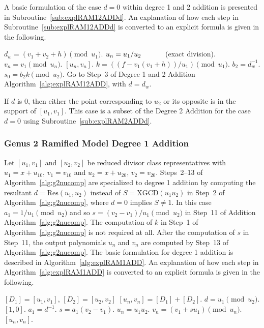 A basic formulation of the case $d = 0$ within degree 1 and 2 addition is presented in
Subroutine~\ref{sub:explRAM12ADDd}. An explanation of how each step in
Subroutine~\ref{sub:explRAM12ADDd} is converted to an explicit formula is given in
the following. 

\begin{subroutine}[htbp]
\caption{Genus 2 Ramified Model Degree 1 and 2 Addition ($d = 0$)\label{sub:explRAM12ADDd}}
\begin{algorithmic} [1]
\State $d_w = (v_1 + v_2 + h) \pmod{u_1}$.
    \State $u_n = u_1/u_2 \quad\quad\quad$ (exact division).
    \State $v_n = v_1 \pmod{u_n}.$
    \State \Return $[u_n,v_n]$.
\Else 
    \State $k = ((f - v_1(v_1 + h))/u_1) \pmod{u_1}$.
    \State $b_2 = d_w^{-1}$.
    \State $s_0 = b_2k \pmod{u_2}$.
    \State Go to Step~3 of Degree 1 and 2 Addition Algorithm~\ref{alg:explRAM12ADD}, with $d = d_w$.
\EndIf
\end{algorithmic}
\end{subroutine}

If $d$ is 0, then either the point corresponding to $u_2$ or its opposite is in
the support of $[u_1,v_1]$. This case is a subset of the Degree 2 Addition for
the case $d=0$ using Subroutine~\ref{sub:explRAM2ADDd}.


\subsubsection{Genus 2 Ramified Model Degree 1 Addition}
Let $[u_1,v_1]$ and $[u_2,v_2]$ be reduced divisor class representatives with
$u_1 = x + u_{10}$, $v_1 = v_{10}$ and $u_2 = x + u_{20}$, $v_2 = v_{20}$.
Steps~2--13 of Algorithm~\ref{alg:g2nucomp} are specialized to degree 1 addition by
computing the resultant $d = \mathrm{Res}(u_1,u_2)$ instead of $S =
\mathrm{XGCD}(u_1 u_2)$ in Step~2 of Algorithm~\ref{alg:g2nucomp}, where $d=0$
implies $S \neq 1$. In this case $a_1 = 1/u_1 \pmod{u_2}$ and so $s = (v_2 -
v_1)/u_1 \pmod{u_2}$ in Step~11 of Addition Algorithm~\ref{alg:g2nucomp}. The
computation of $k$ in Step~1 of Algorithm~\ref{alg:g2nucomp} is not required at
all. After the computation of $s$  in Step~11, the output polynomials $u_n$ and
$v_n$ are computed by Step~13 of Algorithm~\ref{alg:g2nucomp}. The basic
formulation for degree 1 addition is described in
Algorithm~\ref{alg:explRAM1ADD}. An explanation of how each step in
Algorithm~\ref{alg:explRAM1ADD} is converted to an explicit formula is given in
the following.

\begin{algorithm}[htbp]
\caption{Genus 2 Ramified Model Degree 1 Addition\label{alg:explRAM1ADD}}
\begin{algorithmic}[1] 
\Require $[D_1] = [u_1,v_1]$, $[D_2] = [u_2,v_2]$ \smallskip
\Ensure $[u_n,v_n] = [D_1] + [D_2] $.
\algrule
\State $d = u_1 \pmod{u_2}$.
 \Return $[1,0]$.
\EndIf
\State $a_1 = d^{-1}$.
\State $s = a_1(v_2 - v_1)$.
\State $u_n = u_1u_2$.
\State $v_n = (v_1 + su_1) \pmod{u_n}$.
\State \Return $[u_n,v_n]$.
\end{algorithmic}
\end{algorithm}


